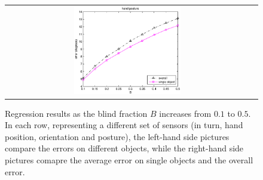 \begin{figure}[htbp]
\begin{center}
\begin{tabular}{cc}
      \includegraphics[width=0.45\textwidth]{error_cmp_pst.eps} \\
    \end{tabular}
    \caption{Regression results as the blind fraction $B$ increases
    from $0.1$ to $0.5$. In each row, representing a different set of
    sensors (in turn, hand position, orientation and posture), the
    left-hand side pictures compare the errors on different objects,
    while the right-hand side pictures comapre the average error on
    single objects and the overall error.}
    \label{fig:err_all}
  \end{center}
\end{figure}
